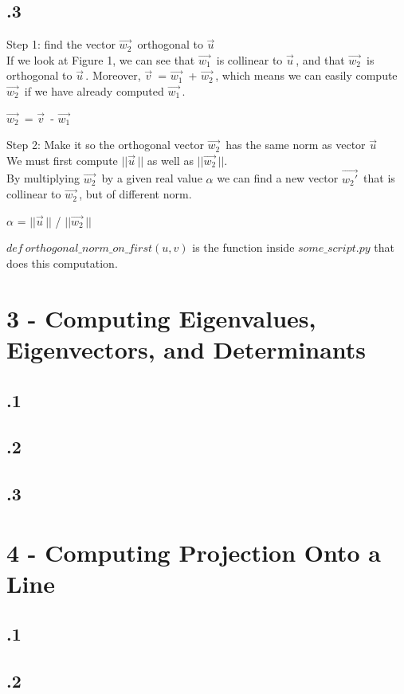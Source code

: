 \documentclass[a4paper]{article}
\begin{document}
\subsection*{.3}
Step 1: find the vector $\vec{w_{2}}^{\,}$ orthogonal to $\vec{u}^{\,}$\\
If we look at Figure 1, we can see that $\vec{w_{1}}^{\,}$ is collinear to $\vec{u}^{\,}$, and that $\vec{w_{2}}^{\,}$ is orthogonal to $\vec{u}^{\,}$. Moreover, $\vec{v}^{\,}$ = $\vec{w_{1}}^{\,}$ + $\vec{w_{2}}^{\,}$, which means we can easily compute $\vec{w_{2}}^{\,}$ if we have already computed $\vec{w_{1}}^{\,}$. 
\begin{center}
$\vec{w_{2}}^{\,}$ = $\vec{v}^{\,}$ - $\vec{w_{1}}^{\,}$
\end{center}
Step 2: Make it so the orthogonal vector $\vec{w_{2}}^{\,}$ has the same norm as vector $\vec{u}^{\,}$\\
We must first compute $||\vec{u}^{\,}||$ as well as $||\vec{w_{2}}^{\,}||$.\\
By multiplying $\vec{w_{2}}^{\,}$ by a given real value $\alpha$ we can find a new vector $\vec{w_{2}'}^{\,}$ that is collinear to $\vec{w_{2}}^{\,}$, but of different norm.
\begin{center}
$\alpha$ = $||\vec{u}^{\,}||$ / $||\vec{w_{2}}^{\,}||$
\end{center}
\textbf{$def\ orthogonal\_norm\_on\_first(u, v)$} is the function inside $some\_script.py$ that does this computation.

\section*{3 - Computing Eigenvalues, Eigenvectors, and Determinants}
\subsection*{.1}
\subsection*{.2}
\subsection*{.3}

\section*{4 - Computing Projection Onto a Line}
\subsection*{.1}
\subsection*{.2}
\end{document}
